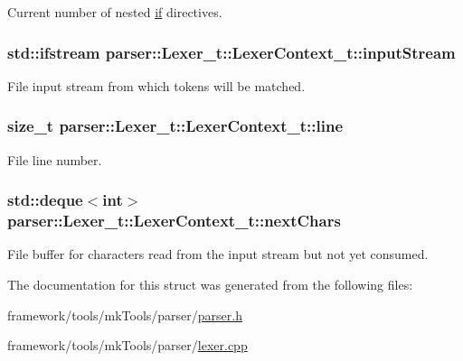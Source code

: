 Current number of nested \hyperlink{wifi_web_ap_8c_a2bf420bda7cb80e4552dcff350cddbef}{if} directives. 

\subsubsection[{\texorpdfstring{input\+Stream}{inputStream}}]{\setlength{\rightskip}{0pt plus 5cm}std\+::ifstream parser\+::\+Lexer\+\_\+t\+::\+Lexer\+Context\+\_\+t\+::input\+Stream}\hypertarget{structparser_1_1_lexer__t_1_1_lexer_context__t_a7efe63cd60e3e171deef92607cd39a76}{}\label{structparser_1_1_lexer__t_1_1_lexer_context__t_a7efe63cd60e3e171deef92607cd39a76}


File input stream from which tokens will be matched. 

\subsubsection[{\texorpdfstring{line}{line}}]{\setlength{\rightskip}{0pt plus 5cm}size\+\_\+t parser\+::\+Lexer\+\_\+t\+::\+Lexer\+Context\+\_\+t\+::line}\hypertarget{structparser_1_1_lexer__t_1_1_lexer_context__t_aaa9235da93077dedbc1f36723d73ae1b}{}\label{structparser_1_1_lexer__t_1_1_lexer_context__t_aaa9235da93077dedbc1f36723d73ae1b}


File line number. 

\subsubsection[{\texorpdfstring{next\+Chars}{nextChars}}]{\setlength{\rightskip}{0pt plus 5cm}std\+::deque$<$int$>$ parser\+::\+Lexer\+\_\+t\+::\+Lexer\+Context\+\_\+t\+::next\+Chars}\hypertarget{structparser_1_1_lexer__t_1_1_lexer_context__t_afa76bd5451382b220b083b8f6e55dc12}{}\label{structparser_1_1_lexer__t_1_1_lexer_context__t_afa76bd5451382b220b083b8f6e55dc12}
File buffer for characters read from the input stream but not yet consumed. 

The documentation for this struct was generated from the following files\+:\begin{DoxyCompactItemize}
\item 
framework/tools/mk\+Tools/parser/\hyperlink{parser_8h}{parser.\+h}\item 
framework/tools/mk\+Tools/parser/\hyperlink{lexer_8cpp}{lexer.\+cpp}\end{DoxyCompactItemize}
